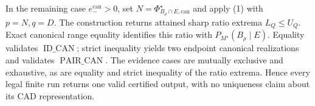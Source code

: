 In the remaining case \(e_-^{\mathrm{can}}>0\), set \(N=\Phi_{B_\rho\cap E,\mathrm{can}}^\star\) and apply (1) with \(p=N,q=D\).  The construction returns attained sharp ratio extrema \(L_Q\le U_Q\).  Exact canonical range equality identifies this ratio with \(P_{M^\star}(B_\rho\mid E)\).  Equality validates \(\operatorname{ID\_CAN}\); strict inequality yields two endpoint canonical realizations and validates \(\operatorname{PAIR\_CAN}\).  The evidence cases are mutually exclusive and exhaustive, as are equality and strict inequality of the ratio extrema.  Hence every legal finite run returns one valid certified output, with no uniqueness claim about its CAD representation.